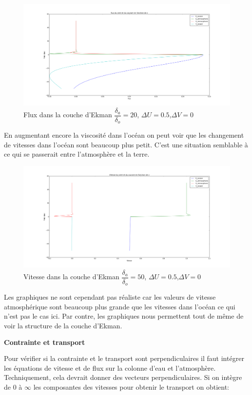 \documentclass[11pt,a4paper,titlepage]{article}
\begin{document}
\begin{figure}[H]
\includegraphics[width = \linewidth]{DELTAODELTAA20FLUX}
\caption{Flux dans la couche d'Ekman $\dfrac{\delta_a}{\delta_o}=20$, $\Delta U = 0.5$,$\Delta V = 0$ }
\label{20f}

\end{figure}

En augmentant encore la viscosité dans l'océan on peut voir que les changement de vitesses dans l'océan sont beaucoup plus petit. C'est une situation semblable à ce qui se passerait entre l'atmosphère et la terre.

\begin{figure}[H]
\includegraphics[width = \linewidth]{DELTAODELTAA50}
\caption{Vitesse dans la couche d'Ekman $\dfrac{\delta_a}{\delta_o}=50$, $\Delta U = 0.5$,$\Delta V = 0$}
\end{figure}

Les graphiques ne sont cependant pas réaliste car les valeurs de vitesse atmosphérique sont beaucoup plus grande que les vitesses dans l'océan ce qui n'est pas le cas ici. Par contre, les graphiques nous permettent tout de même de voir la structure de la couche d'Ekman.

\textbf{Contrainte et transport}

Pour vérifier si la contrainte et le transport sont perpendiculaires il faut intégrer les équations de vitesse et de flux sur la colonne d'eau et l'atmosphère. Techniquement, cela devrait donner des vecteurs perpendiculaires. Si on intègre de $0$ à $\infty$ les composantes des vitesses pour obtenir le transport on obtient:
\end{document}
